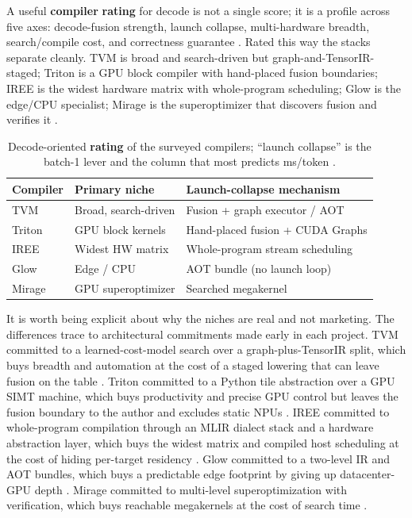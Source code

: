 A useful \textbf{compiler} \textbf{rating} for decode is not a single score; it is a profile across five axes: decode-fusion strength, launch collapse, multi-hardware breadth, search/compile cost, and correctness guarantee \citep{patel2025llminference}. Rated this way the stacks separate cleanly. TVM is broad and search-driven but graph-and-TensorIR-staged; Triton is a GPU block compiler with hand-placed fusion boundaries; IREE is the widest hardware matrix with whole-program scheduling; Glow is the edge/CPU specialist; Mirage is the superoptimizer that discovers fusion and verifies it \citep{chen2018tvm,tillet2019triton,iree2024,rotem2018glow,wu2024mirage}.

\begin{table}[t]
\centering
\caption{Decode-oriented \textbf{rating} of the surveyed compilers; ``launch collapse'' is the batch-1 lever and the column that most predicts ms/token \citep{taxbreak2026,memoryfloor2026}.}
\label{tab:ch21_compiler_ratings}
\begin{tabular}{lll}
\toprule
Compiler & Primary niche & Launch-collapse mechanism \\
\midrule
TVM & Broad, search-driven & Fusion + graph executor / AOT \\
Triton & GPU block kernels & Hand-placed fusion + CUDA Graphs \\
IREE & Widest HW matrix & Whole-program stream scheduling \\
Glow & Edge / CPU & AOT bundle (no launch loop) \\
Mirage & GPU superoptimizer & Searched megakernel \\
\bottomrule
\end{tabular}
\end{table}

It is worth being explicit about why the niches are real and not marketing. The differences trace to architectural commitments made early in each project. TVM committed to a learned-cost-model search over a graph-plus-TensorIR split, which buys breadth and automation at the cost of a staged lowering that can leave fusion on the table \citep{chen2018tvm,zheng2020ansor}. Triton committed to a Python tile abstraction over a GPU SIMT machine, which buys productivity and precise GPU control but leaves the fusion boundary to the author and excludes static NPUs \citep{tillet2019triton,tritonlang2024}. IREE committed to whole-program compilation through an MLIR dialect stack and a hardware abstraction layer, which buys the widest matrix and compiled host scheduling at the cost of hiding per-target residency \citep{iree2024}. Glow committed to a two-level IR and AOT bundles, which buys a predictable edge footprint by giving up datacenter-GPU depth \citep{rotem2018glow}. Mirage committed to multi-level superoptimization with verification, which buys reachable megakernels at the cost of search time \citep{wu2024mirage}.

